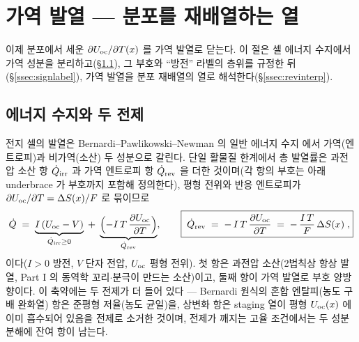 \section{가역 발열 --- 분포를 재배열하는 열}\label{sec:revheat}

이제 분포에서 세운 $\partial U_{\mathrm{oc}}/\partial T(x)$ 를 가역 발열로 닫는다. 이 절은 셀 에너지 수지에서 가역 성분을
분리하고(\S\ref{ssec:balance}), 그 부호와 ``방전'' 라벨의 층위를 규정한 뒤(\S\ref{ssec:signlabel}), 가역 발열을
분포 재배열의 열로 해석한다(\S\ref{ssec:revinterp}).

\subsection{에너지 수지와 두 전제}\label{ssec:balance}
전지 셀의 발열은 Bernardi--Pawlikowski--Newman 의 일반 에너지 수지 \cite{bernardi1985} 에서 가역(엔트로피)과
비가역(소산) 두 성분으로 갈린다. 단일 활물질 한계에서 총 발열률은 과전압 소산 항 $\dot Q_{\mathrm{irr}}$ 과 가역
엔트로피 항 $\dot Q_{\mathrm{rev}}$ 을 더한 것이며(각 항의 부호는 아래 underbrace 가 부호까지 포함해 정의한다),
평형 전위와 반응 엔트로피가 $\partial U_{\mathrm{oc}}/\partial T=\Delta S(x)/F$ 로 묶이므로
\begin{equation}
\dot Q \;=\; \underbrace{I\,(U_{\mathrm{oc}}-V)}_{\dot Q_{\mathrm{irr}}\ge0}\;+\;\underbrace{\Bigl(-I\,T\,\frac{\partial U_{\mathrm{oc}}}{\partial T}\Bigr)}_{\dot Q_{\mathrm{rev}}},
\qquad
\boxed{\;\dot Q_{\mathrm{rev}} \;=\; -\,I\,T\,\frac{\partial U_{\mathrm{oc}}}{\partial T}\;=\;-\,\frac{I\,T}{F}\,\Delta S(x)\;,}
\label{eq:qrev}
\end{equation}
이다($I>0$ 방전, $V$ 단자 전압, $U_{\mathrm{oc}}$ 평형 전위). 첫 항은 과전압 소산(2법칙상 항상 발열, Part I 의
동역학 꼬리$\cdot$분극이 만드는 소산)이고, 둘째 항이 가역 발열로 부호 양방향이다. 이 축약에는 두 전제가 더
들어 있다 --- Bernardi 원식의 혼합 엔탈피(농도 구배 완화열) 항은 준평형 저율(농도 균일)을, 상변화 항은
staging 열이 평형 $U_{\mathrm{oc}}(x)$ 에 이미 흡수되어 있음을 전제로 소거한 것이며, 전제가 깨지는 고율 조건에서는 두
성분 분해에 잔여 항이 남는다.

